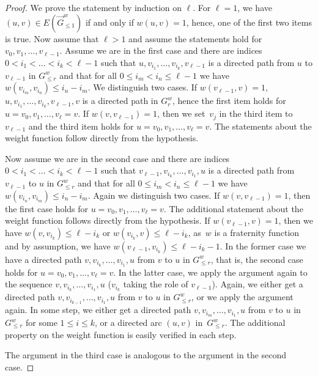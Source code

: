 \documentclass[1p,number,a4paper]{elsarticle}
\theoremstyle{remark}
\begin{document}
\begin{proof}
We prove the statement by induction on $\ell$. For $\ell=1$, 
we have $(u,v)\in E(\vec{G}^w_{\leq 1})$ if and only if 
$w(u,v)=1$, hence, one of the first two items is true. 
Now assume that 
$\ell>1$ and assume the statements hold for 
$v_0,v_1,\ldots, v_{\ell-1}$. Assume we are in the first case and 
there are indices $0< i_1<\ldots<i_k< \ell-1$ 
such that $u,v_{i_1}, \ldots, v_{i_k},v_{\ell-1}$ is a directed 
path from $u$ to $v_{\ell-1}$ in $G^w_{\leq r}$ and that 
for all $0\leq i_m<i_n\leq \ell-1$ we have 
$w(v_{i_m}, v_{i_n})\leq i_n-i_m$. 
We distinguish
two cases. If $w(v_{\ell-1},v)=1$, $u,v_{i_1}, \ldots, 
v_{i_k},v_{\ell-1},v$ is a directed path in $G^w_r$, hence the
first item holds for $u=v_0,v_1,\ldots, v_\ell=v$. If $w(v,v_{\ell-1})=1$, then we set~$v_j$ in 
the third item to $v_{\ell-1}$ and the third item holds for 
$u=v_0,v_1,\ldots, v_\ell=v$. The statements about the 
weight function follow directly from the hypothesis. 

Now assume we are in the second case and there are indices 
$0< i_1<\ldots<i_k< \ell-1$ 	such that $v_{\ell-1},v_{i_k}, 
\ldots, v_{i_1},u$ is a directed path from $v_{\ell-1}$ to $u$ 
in $G^w_{\leq r}$ and that for all $0\leq i_m<i_n\leq \ell-1$ we have 
$w(v_{i_n},v_{i_m})\leq i_n-
i_m$. Again we distinguish two cases. If $w(v,v_{\ell-1})=1$, then 
the first case holds for \mbox{$u=v_0,v_1,\ldots, v_\ell=v$}. The 
additional statement about the weight function follows directly
from the hypothesis. If $w(v_{\ell-1},v)=1$, then we have 
$w(v,v_{i_k})\leq \ell-i_k$ or $w(v_{i_k},v)\leq \ell-i_k$, 
as~$w$ is a fraternity function and by assumption, we have 
$w(v_{\ell-1},v_{i_k})\leq \ell-i_k-1$. In the former case 
we have a directed path $v,v_{i_k}, 
\ldots, v_{i_1},u$ from $v$ to $u$ in $G^w_{\leq r}$, that is, 
the second case holds for $u=v_0,v_1,\ldots, v_\ell=v$. 
In the latter case, we apply the argument again to the sequence 
$v,v_{i_k}, \ldots, v_{i_1},u$ ($v_{i_k}$ taking the role of 
$v_{\ell-1}$). Again, we either get a directed path $v,v_{i_{k-1}}, 
\ldots, v_{i_1},u$ from $v$ to $u$ in $G^w_{\leq r}$, or
we apply the argument again. In some step, we either get
a directed path $v,v_{i_{m}}, \ldots, v_{i_1},u$ from 
$v$ to $u$ in $G^w_{\leq r}$ for some $1\leq i\leq k$, or 
a directed arc $(u,v)$ in~$G^w_{\leq r}$. The additional property on 
the weight function is easily verified in each step. 

The argument in the third case is analogous to the argument 
in the second case. 
\end{proof}
\end{document}
